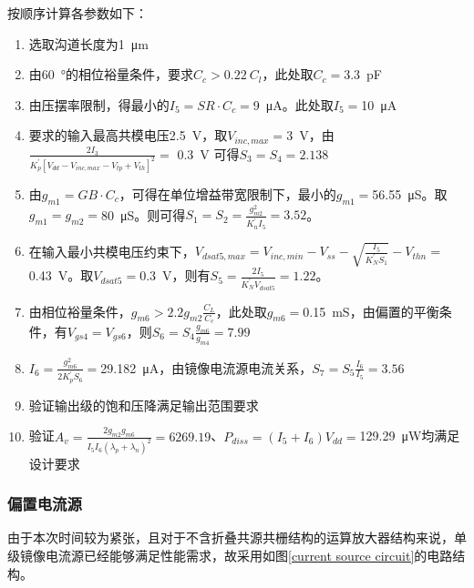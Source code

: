 \documentclass[UTF8]{ctexart}
\numberwithin{figure}{subsection}
\numberwithin{table}{subsection}
\numberwithin{equation}{subsection}
\begin{document}
按顺序计算各参数如下：
\begin{enumerate}
    \item 选取沟道长度为\SI{1}{\micro\meter}
    \item 由\SI[]{60}{\degree}的相位裕量条件，要求\(C_c > 0.22\ C_l\)，此处取\(C_c = \)\SI[]{3.3}{\pico\farad}
    \item 由压摆率限制，得最小的\(I_5 = SR \cdot C_c = \)\SI[]{9}{\micro\ampere}。此处取\(I_5 = \)\SI[]{10}{\micro\ampere}
    \item 要求的输入最高共模电压\SI[]{2.5}{\volt}，取\(V_{inc,max} = \)\SI[]{3}{\volt}，由\(\frac{2I_3}{K^{'}_{p} \left[ V_{dd} - V_{inc,max} - V_{tp} + V_{th} \right] ^{2}} = \) \SI[]{0.3}{\volt} 可得\(S_3 = S_4 = 2.138\)
    \item 由\(g_{m1} = GB \cdot C_c\)，可得在单位增益带宽限制下，最小的\(g_{m1} = \)\SI[]{56.55}{\micro\siemens}。取\(g_{m1} = g_{m2} = \)\SI[]{80}{\micro\siemens}。则可得\(S_1 = S_2 = \frac{g_{m2}^{2}}{K^{'}_{n} I_5} = 3.52\)。
    \item 在输入最小共模电压约束下，\(V_{dsat5, max} = V_{inc,min} - V_{ss} - \sqrt{\frac{I_5}{K^{'}_N S_1}} - V_{thn} = \)\SI[]{0.43}{\volt}。取\(V_{dsat5} =\)\SI[]{0.3}{\volt}，则有\(S_5 = \frac{2I_5}{K^{'}_N V_{dsat5}} = 1.22\)。
    \item 由相位裕量条件，\(g_{m6} > 2.2 g_{m2} \frac{C_L}{C_c}\)，此处取\(g_{m6} = \)\SI[]{0.15}{\milli\siemens}，由偏置的平衡条件，有\(V_{gs4} = V_{gs6}\)，则\(S_6 = S_4 \frac{g_{m6}}{g_{m4}} = 7.99\)
    \item \(I_6 = \frac{g_{m6}^{2}}{2K_{p}^{'}S_6} = \)\SI[]{29.182}{\micro\ampere}，由镜像电流源电流关系，\(S_7 = S_5 \frac{I_6}{I_5} = 3.56\)
    \item 验证输出级的饱和压降满足输出范围要求
    \item 验证\(A_v = \frac{2g_{m2}g_{m6}}{I_5 I_6 (\lambda_p + \lambda_n)^2} = 6269.19\)、\(P_{diss} = (I_5 + I_6)V_{dd} = \)\SI{129.29}{\micro\watt}均满足设计要求
\end{enumerate}

\subsubsection{偏置电流源}
由于本次时间较为紧张，且对于不含折叠共源共栅结构的运算放大器结构来说，单级镜像电流源已经能够满足性能需求，故采用如图\ref{current source circuit}的电路结构。
\end{document}
